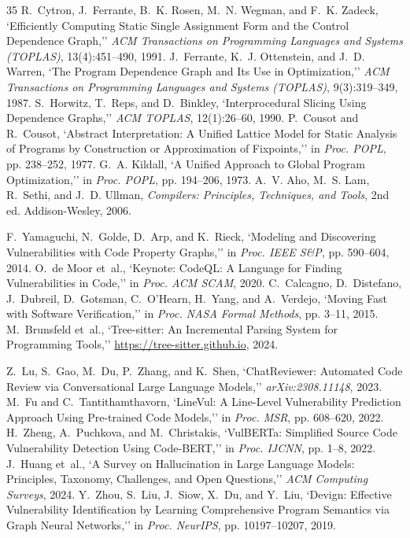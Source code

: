 \documentclass[10pt,conference]{IEEEtran}
\begin{document}
\begin{thebibliography}{35}
 R.~Cytron, J.~Ferrante, B.~K. Rosen, M.~N. Wegman, and F.~K. Zadeck, `Efficiently Computing Static Single Assignment Form and the Control Dependence Graph,'' \emph{ACM Transactions on Programming Languages and Systems (TOPLAS)}, 13(4):451--490, 1991.
 J.~Ferrante, K.~J. Ottenstein, and J.~D. Warren, `The Program Dependence Graph and Its Use in Optimization,'' \emph{ACM Transactions on Programming Languages and Systems (TOPLAS)}, 9(3):319--349, 1987.
 S.~Horwitz, T.~Reps, and D.~Binkley, `Interprocedural Slicing Using Dependence Graphs,'' \emph{ACM TOPLAS}, 12(1):26--60, 1990.
 P.~Cousot and R.~Cousot, `Abstract Interpretation: A Unified Lattice Model for Static Analysis of Programs by Construction or Approximation of Fixpoints,'' in \emph{Proc. POPL}, pp. 238--252, 1977.
 G.~A. Kildall, `A Unified Approach to Global Program Optimization,'' in \emph{Proc. POPL}, pp. 194--206, 1973.
 A.~V. Aho, M.~S. Lam, R.~Sethi, and J.~D. Ullman, \emph{Compilers: Principles, Techniques, and Tools}, 2nd ed. Addison-Wesley, 2006.

 F.~Yamaguchi, N.~Golde, D.~Arp, and K.~Rieck, `Modeling and Discovering Vulnerabilities with Code Property Graphs,'' in \emph{Proc. IEEE S\&P}, pp. 590--604, 2014.
 O.~de Moor et~al., `Keynote: CodeQL: A Language for Finding Vulnerabilities in Code,'' in \emph{Proc. ACM SCAM}, 2020.
 C.~Calcagno, D.~Distefano, J.~Dubreil, D.~Gotsman, C.~O'Hearn, H.~Yang, and A.~Verdejo, `Moving Fast with Software Verification,'' in \emph{Proc. NASA Formal Methods}, pp. 3--11, 2015.
 M.~Brunsfeld et~al., `Tree-sitter: An Incremental Parsing System for Programming Tools,'' \url{https://tree-sitter.github.io}, 2024.

 Z.~Lu, S.~Gao, M.~Du, P.~Zhang, and K.~Shen, `ChatReviewer: Automated Code Review via Conversational Large Language Models,'' \emph{arXiv:2308.11148}, 2023.
 M.~Fu and C.~Tantithamthavorn, `LineVul: A Line-Level Vulnerability Prediction Approach Using Pre-trained Code Models,'' in \emph{Proc. MSR}, pp. 608--620, 2022.
 H.~Zheng, A.~Puchkova, and M.~Christakis, `VulBERTa: Simplified Source Code Vulnerability Detection Using Code-BERT,'' in \emph{Proc. IJCNN}, pp. 1--8, 2022.
 J.~Huang et~al., `A Survey on Hallucination in Large Language Models: Principles, Taxonomy, Challenges, and Open Questions,'' \emph{ACM Computing Surveys}, 2024.
 Y.~Zhou, S.~Liu, J.~Siow, X.~Du, and Y.~Liu, `Devign: Effective Vulnerability Identification by Learning Comprehensive Program Semantics via Graph Neural Networks,'' in \emph{Proc. NeurIPS}, pp. 10197--10207, 2019.


\end{thebibliography}
\end{document}
